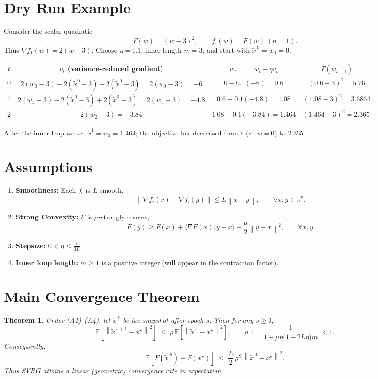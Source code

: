 \documentclass{article}
\newtheorem{theorem}{Theorem}
\newcommand{\E}{\mathbb{E}}
\newcommand{\R}{\mathbb{R}}
\newcommand{\norm}[1]{\left\lVert #1\right\rVert}
\begin{document}
\section*{Dry Run Example}
Consider the scalar quadratic 
\[
F(w)= (w-3)^2,\qquad f_i(w)=F(w)\;(n=1).
\]
Thus $\nabla f_1(w)=2(w-3)$.  Choose $\eta=0.1$, inner length $m=3$, and start with $\tilde{x}^{\,0}=w_0=0$.

\begin{center}
\begin{tabular}{c|c|c|c}
$t$ & $v_t$ (variance‑reduced gradient) & $w_{t+1}=w_t-\eta v_t$ & $F(w_{t+1})$\\ \hline
0 & $2(w_0-3)-2(\tilde{x}^{0}-3)+2(\tilde{x}^{0}-3)=2(w_0-3)= -6$ & $0-0.1(-6)=0.6$ & $(0.6-3)^2=5.76$\\
1 & $2(w_1-3)-2(\tilde{x}^{0}-3)+2(\tilde{x}^{0}-3)=2(w_1-3)= -4.8$ & $0.6-0.1(-4.8)=1.08$ & $(1.08-3)^2=3.6864$\\
2 & $2(w_2-3)= -3.84$ & $1.08-0.1(-3.84)=1.464$ & $(1.464-3)^2=2.365\,$\\
\end{tabular}
\end{center}
After the inner loop we set $\tilde{x}^{1}=w_{3}=1.464$; the objective has decreased from $9$ (at $w=0$) to $2.365$.

\section*{Assumptions}
\begin{enumerate}
\item \textbf{Smoothness:} Each $f_i$ is $L$‑smooth,
\[
\norm{\nabla f_i(x)-\nabla f_i(y)}\le L\norm{x-y},\qquad\forall x,y\in\R^{d}. \tag{A1}
\]
\item \textbf{Strong Convexity:} $F$ is $\mu$‑strongly convex,
\[
F(y)\ge F(x)+\langle\nabla F(x),y-x\rangle+\frac{\mu}{2}\norm{y-x}^{2},\qquad\forall x,y. \tag{A2}
\]
\item \textbf{Stepsize:} $\displaystyle 0<\eta\le\frac{1}{3L}$. 
\item \textbf{Inner loop length:} $m\ge 1$ is a positive integer (will appear in the contraction factor). 
\end{enumerate}

\section*{Main Convergence Theorem}
\begin{theorem}
\label{thm:svrg-linear}
Under (A1)–(A4), let $\tilde{x}^{\,s}$ be the snapshot after epoch $s$. Then for any $s\ge0$,
\[
\E\!\left[\norm{\tilde{x}^{\,s+1}-x^{\star}}^{2}\right]\;\le\;\rho\,\E\!\left[\norm{\tilde{x}^{\,s}-x^{\star}}^{2}\right],
\qquad 
\rho\;:=\;\frac{1}{1+\mu\eta\bigl(1-2L\eta\bigr)m}\;<1 .
\tag{T1}
\]
Consequently,
\[
\E\!\left[F(\tilde{x}^{\,S})-F(x^{\star})\right]
\;\le\;
\frac{L}{2}\,\rho^{S}\,\norm{\tilde{x}^{\,0}-x^{\star}}^{2}.
\tag{T2}
\]
Thus SVRG attains a \emph{linear} (geometric) convergence rate in expectation.
\end{theorem}
\end{document}
